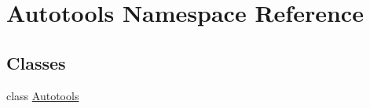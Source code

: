 \hypertarget{namespaceAutotools}{\section{Autotools Namespace Reference}
\label{namespaceAutotools}
}
\subsection*{Classes}
\begin{DoxyCompactItemize}
\item 
class \hyperlink{classAutotools_1_1Autotools}{Autotools}
\end{DoxyCompactItemize}
